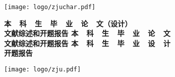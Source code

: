 \thispagestyle{empty}
\setcounter{page}{-1}

\hskip 40mm

\begin{center}
    \texttt{[image: logo/zjuchar.pdf]}
\end{center}

\begin{center}
     \heiti \bfseries
    {
        本~~科~~生~~毕~~业~~论~~文（设计）
        \\ \vskip 24pt
        文献综述和开题报告
    }
    {
        {
            本~~科~~生~~毕~~业~~论~~文
            \\ \vskip 24pt
            文献综述和开题报告
        }
        {
            本~~科~~生~~毕~~业~~设~~计
            \\ \vskip 24pt
            开题报告
        }
    }
\end{center}

\vskip 40pt

\begin{center}
    \texttt{[image: logo/zju.pdf]}
\end{center}

